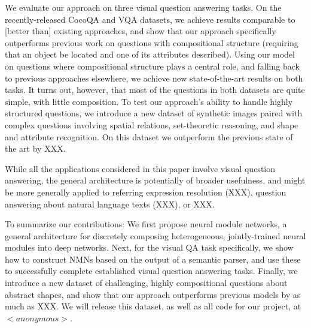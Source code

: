 
We evaluate our approach on three visual question answering tasks. On the
recently-released CocoQA \cite{yu15arxiv} and  VQA \cite{antol15iccv} datasets,
we achieve results comparable to [better than] existing approaches, and show
that our approach specifically outperforms previous work on questions with
compositional structure (\eg requiring that an object be located and one of its
attributes described). Using our model on questions where compositional
structure plays a central role, and falling back to previous approaches
elsewhere, we achieve new state-of-the-art results on both tasks. It turns out,
however, that most of the questions in both datasets are quite simple, with
little composition. To test our approach's ability to handle highly structured
questions, we introduce a new dataset of synthetic images paired with complex
questions involving spatial relations, set-theoretic reasoning, and shape and
attribute recognition. On this dataset we outperform the previous state of the
art by XXX.

While all the applications considered in this paper involve visual question
answering, the general architecture is potentially of broader usefulness, and
might be more generally applied to referring expression resolution (XXX),
question answering about natural language texts (XXX), or XXX.


To summarize our contributions: We first propose neural module networks, a
general architecture for discretely composing heterogeneous, jointly-trained
neural modules into deep networks. Next, for the visual QA task specifically, we
show how to construct NMNs based on the output of a semantic parser, and use
these to successfully complete established visual question answering tasks.
Finally, we introduce a new dataset of challenging, highly compositional
questions about abstract shapes, and show that our approach outperforms previous
models by as much as XXX. We will release this dataset, as well as all code for
our project, at $<anonymous>$.
